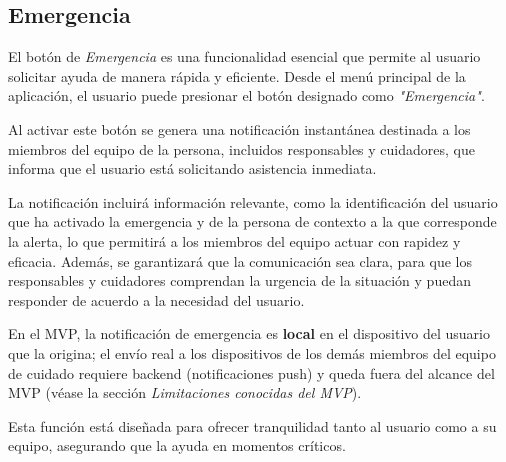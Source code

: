 \documentclass[a4paper,12pt]{article}
\begin{document}
    \subsection{Emergencia}
    \par El botón de \textit{Emergencia} es una funcionalidad esencial que permite al usuario solicitar ayuda de manera rápida y eficiente. Desde el menú principal de la aplicación, el usuario puede presionar el botón designado como \textit{"Emergencia"}.
    \par Al activar este botón se genera una notificación instantánea destinada a los miembros del equipo de la persona, incluidos responsables y cuidadores, que informa que el usuario está solicitando asistencia inmediata.
    \par La notificación incluirá información relevante, como la identificación del usuario que ha activado la emergencia y de la persona de contexto a la que corresponde la alerta, lo que permitirá a los miembros del equipo actuar con rapidez y eficacia. Además, se garantizará que la comunicación sea clara, para que los responsables y cuidadores comprendan la urgencia de la situación y puedan responder de acuerdo a la necesidad del usuario.
    \par En el MVP, la notificación de emergencia es \textbf{local} en el dispositivo del usuario que la origina; el envío real a los dispositivos de los demás miembros del equipo de cuidado requiere backend (notificaciones push) y queda fuera del alcance del MVP (véase la sección \textit{Limitaciones conocidas del MVP}).
    \par Esta función está diseñada para ofrecer tranquilidad tanto al usuario como a su equipo, asegurando que la ayuda en momentos críticos.
\end{document}
